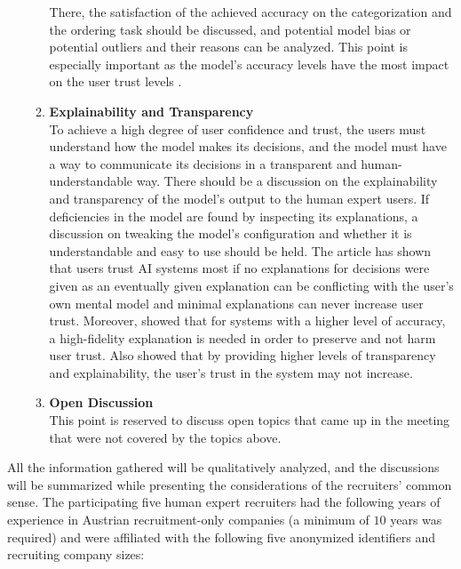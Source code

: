 \documentclass[draft,final]{thesisclass} %
\begin{document}
\begin{enumerate}
\begin{enumerate}
        There, the satisfaction of the achieved accuracy on the categorization and the ordering task should be discussed, and potential model bias or potential outliers and their reasons can be analyzed.
        This point is especially important as the model's accuracy levels have the most impact on the user trust levels \parencite[6]{accuracy_user_trust}.
        \item \textbf{Explainability and Transparency} \parencite{accuracy_user_trust}\\
        To achieve a high degree of user confidence and trust, the users must understand how the model makes its decisions, and the model must have a way to communicate its decisions in a transparent and human-understandable way.
        There should be a discussion on the explainability and transparency of the model's output to the human expert users.
        If deficiencies in the model are found by inspecting its explanations, a discussion on tweaking the model's configuration and whether it is understandable and easy to use should be held.
        The article \textcite[6]{accuracy_user_trust} has shown that users trust \acs{AI} systems most if no explanations for decisions were given as an eventually given explanation can be conflicting with the user's own mental model and minimal explanations can never increase user trust. Moreover, \textcite[6]{accuracy_user_trust} showed that for systems with a higher level of accuracy, a high-fidelity explanation is needed in order to preserve and not harm user trust.
        Also \textcite[11]{assistive_ai_systems} showed that by providing higher levels of transparency and explainability, the user's trust in the system may not increase.
        \item \textbf{Open Discussion}\\
        This point is reserved to discuss open topics that came up in the meeting that were not covered by the topics above.
    \end{enumerate}
\end{enumerate}
All the information gathered will be qualitatively analyzed, and the discussions will be summarized while presenting the considerations of the recruiters' common sense.
The participating five human expert recruiters had the following years of experience in Austrian recruitment-only companies (a minimum of $10$ years was required) and were affiliated with the following five anonymized identifiers and recruiting company sizes:
\end{document}
